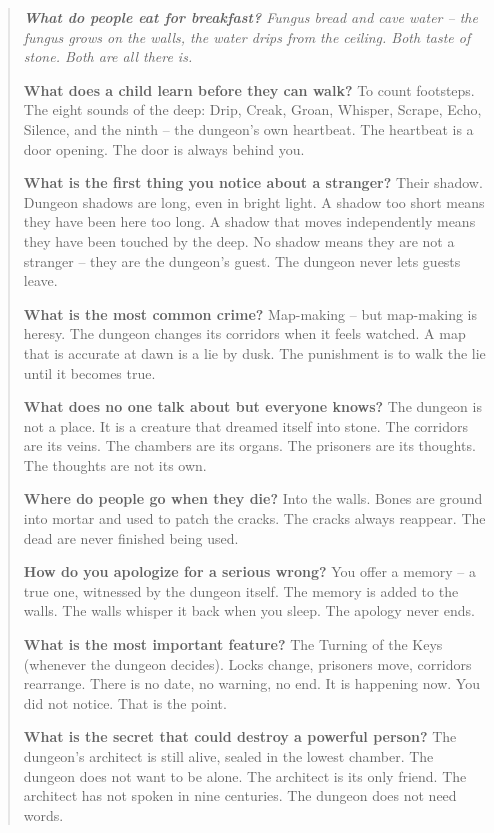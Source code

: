 \documentclass[12pt,oneside]{book}
\newenvironment{almanac}
  {\begin{quote}\small\itshape}
  {\end{quote}}
\begin{document}
\vspace{1em}
\begin{almanac}
\textbf{What do people eat for breakfast?} Fungus bread and cave water -- the fungus grows on the walls, the water drips from the ceiling. Both taste of stone. Both are all there is.

\textbf{What does a child learn before they can walk?} To count footsteps. The eight sounds of the deep: Drip, Creak, Groan, Whisper, Scrape, Echo, Silence, and the ninth -- the dungeon's own heartbeat. The heartbeat is a door opening. The door is always behind you.

\textbf{What is the first thing you notice about a stranger?} Their shadow. Dungeon shadows are long, even in bright light. A shadow too short means they have been here too long. A shadow that moves independently means they have been touched by the deep. No shadow means they are not a stranger -- they are the dungeon's guest. The dungeon never lets guests leave.

\textbf{What is the most common crime?} Map-making -- but map-making is heresy. The dungeon changes its corridors when it feels watched. A map that is accurate at dawn is a lie by dusk. The punishment is to walk the lie until it becomes true.

\textbf{What does no one talk about but everyone knows?} The dungeon is not a place. It is a creature that dreamed itself into stone. The corridors are its veins. The chambers are its organs. The prisoners are its thoughts. The thoughts are not its own.

\textbf{Where do people go when they die?} Into the walls. Bones are ground into mortar and used to patch the cracks. The cracks always reappear. The dead are never finished being used.

\textbf{How do you apologize for a serious wrong?} You offer a memory -- a true one, witnessed by the dungeon itself. The memory is added to the walls. The walls whisper it back when you sleep. The apology never ends.

\textbf{What is the most important feature?} The Turning of the Keys (whenever the dungeon decides). Locks change, prisoners move, corridors rearrange. There is no date, no warning, no end. It is happening now. You did not notice. That is the point.

\textbf{What is the secret that could destroy a powerful person?} The dungeon's architect is still alive, sealed in the lowest chamber. The dungeon does not want to be alone. The architect is its only friend. The architect has not spoken in nine centuries. The dungeon does not need words.
\end{almanac}
\end{document}

